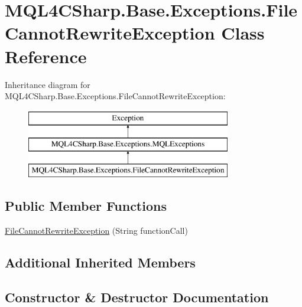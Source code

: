 \hypertarget{class_m_q_l4_c_sharp_1_1_base_1_1_exceptions_1_1_file_cannot_rewrite_exception}{}\section{M\+Q\+L4\+C\+Sharp.\+Base.\+Exceptions.\+File\+Cannot\+Rewrite\+Exception Class Reference}
\label{class_m_q_l4_c_sharp_1_1_base_1_1_exceptions_1_1_file_cannot_rewrite_exception}
Inheritance diagram for M\+Q\+L4\+C\+Sharp.\+Base.\+Exceptions.\+File\+Cannot\+Rewrite\+Exception\+:\begin{figure}[H]
\begin{center}
\leavevmode
\includegraphics[height=3.000000cm]{class_m_q_l4_c_sharp_1_1_base_1_1_exceptions_1_1_file_cannot_rewrite_exception}
\end{center}
\end{figure}
\subsection*{Public Member Functions}
\begin{DoxyCompactItemize}
\item 
\hyperlink{class_m_q_l4_c_sharp_1_1_base_1_1_exceptions_1_1_file_cannot_rewrite_exception_a38cfcf2a6602ee88f22da89cce0ca7e8}{File\+Cannot\+Rewrite\+Exception} (String function\+Call)
\end{DoxyCompactItemize}
\subsection*{Additional Inherited Members}


\subsection{Constructor \& Destructor Documentation}
